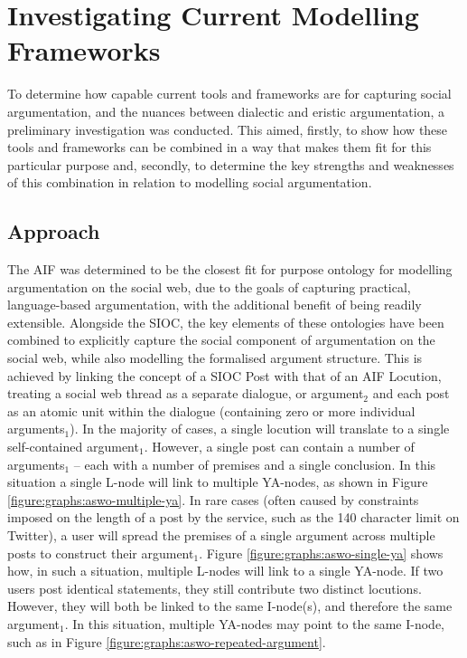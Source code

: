 \chapter{Investigating Current Modelling Frameworks}
\label{investigation}
To determine how capable current tools and frameworks are for capturing social argumentation, and the nuances between dialectic and eristic argumentation, a preliminary investigation was conducted. This aimed, firstly, to show how these tools and frameworks can be combined in a way that makes them fit for this particular purpose and, secondly, to determine the key strengths and weaknesses of this combination in relation to modelling social argumentation.


\section{Approach}
The AIF was determined to be the closest fit for purpose ontology for modelling argumentation on the social web, due to the goals of capturing practical, language-based argumentation, with the additional benefit of being readily extensible. Alongside the SIOC, the key elements of these ontologies have been combined to explicitly capture the social component of argumentation on the social web, while also modelling the formalised argument structure. This is achieved by linking the concept of a SIOC Post with that of an AIF Locution, treating a social web thread as a separate dialogue, or argument$_2$ and each post as an atomic unit within the dialogue (containing zero or more individual arguments$_1$). In the majority of cases, a single locution will translate to a single self-contained argument$_1$. However, a single post can contain a number of arguments$_1$ -- each with a number of premises and a single conclusion. In this situation a single L-node will link to multiple YA-nodes, as shown in Figure \ref{figure:graphs:aswo-multiple-ya}. In rare cases (often caused by constraints imposed on the length of a post by the service, such as the 140 character limit on Twitter), a user will spread the premises of a single argument across multiple posts to construct their argument$_1$. Figure \ref{figure:graphs:aswo-single-ya} shows how, in such a situation, multiple L-nodes will link to a single YA-node. If two users post identical statements, they still contribute two distinct locutions. However, they will both be linked to the same I-node(s), and therefore the same argument$_1$. In this situation, multiple YA-nodes may point to the same I-node, such as in Figure \ref{figure:graphs:aswo-repeated-argument}.


